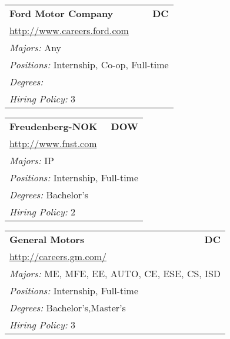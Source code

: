 \documentclass[twoside]{article}
\begin{document}
\begin{center}
\begin{multicols}{3}
\begin{FlushLeft}
\begin{minipage}{.9\columnwidth}
\end{minipage}
 
\begin{minipage}{.9\columnwidth}\begin{tabularx}{.95\columnwidth}{Xr}
                 {\Large\bf Ford Motor Company} & {\Large\bf DC}\\
    \multicolumn{2}{p{.95\columnwidth}}{\url{http://www.careers.ford.com}}\\
    \multicolumn{2}{p{.95\columnwidth}}{\emph{Majors:} Any}\\
    \multicolumn{2}{p{.95\columnwidth}}{\emph{Positions:} Internship, Co-op, Full-time}\\
    \multicolumn{2}{p{.95\columnwidth}}{\emph{Degrees:} }\\
    \multicolumn{2}{p{.95\columnwidth}}{\emph{Hiring Policy:} 3}\\
    \end{tabularx}
    
\end{minipage}
 
\begin{minipage}{.9\columnwidth}\begin{tabularx}{.95\columnwidth}{Xr}
                 {\Large\bf Freudenberg-NOK} & {\Large\bf DOW}\\
    \multicolumn{2}{p{.95\columnwidth}}{\url{http://www.fnst.com}}\\
    \multicolumn{2}{p{.95\columnwidth}}{\emph{Majors:} IP}\\
    \multicolumn{2}{p{.95\columnwidth}}{\emph{Positions:} Internship, Full-time}\\
    \multicolumn{2}{p{.95\columnwidth}}{\emph{Degrees:} Bachelor's}\\
    \multicolumn{2}{p{.95\columnwidth}}{\emph{Hiring Policy:} 2}\\
    \end{tabularx}
    
\end{minipage}
 
\begin{minipage}{.9\columnwidth}\begin{tabularx}{.95\columnwidth}{Xr}
                 {\Large\bf General Motors} & {\Large\bf DC}\\
    \multicolumn{2}{p{.95\columnwidth}}{\url{http://careers.gm.com/}}\\
    \multicolumn{2}{p{.95\columnwidth}}{\emph{Majors:} ME, MFE, EE, AUTO, CE, ESE, CS, ISD}\\
    \multicolumn{2}{p{.95\columnwidth}}{\emph{Positions:} Internship, Full-time}\\
    \multicolumn{2}{p{.95\columnwidth}}{\emph{Degrees:} Bachelor's,Master's}\\
    \multicolumn{2}{p{.95\columnwidth}}{\emph{Hiring Policy:} 3}\\
    \end{tabularx}
    

\end{minipage}
\end{FlushLeft}
\end{multicols}
\end{center}
\end{document}
